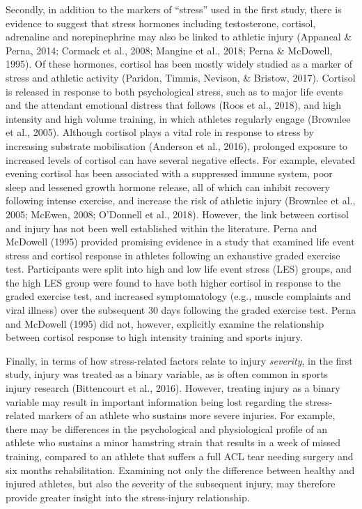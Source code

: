 \documentclass[man,floatsintext]{apa6}
\begin{document}
Secondly, in addition to the markers of \enquote{stress} used in the first study, there is evidence to suggest that stress hormones including testosterone, cortisol, adrenaline and norepinephrine may also be linked to athletic injury (Appaneal \& Perna, 2014; Cormack et al., 2008; Mangine et al., 2018; Perna \& McDowell, 1995).
Of these hormones, cortisol has been mostly widely studied as a marker of stress and athletic activity (Paridon, Timmis, Nevison, \& Bristow, 2017).
Cortisol is released in response to both psychological stress, such as to major life events and the attendant emotional distress that follows (Roos et al., 2018), and high intensity and high volume training, in which athletes regularly engage (Brownlee et al., 2005).
Although cortisol plays a vital role in response to stress by increasing substrate mobilisation (Anderson et al., 2016), prolonged exposure to increased levels of cortisol can have several negative effects.
For example, elevated evening cortisol has been associated with a suppressed immune system, poor sleep and lessened growth hormone release, all of which can inhibit recovery following intense exercise, and increase the risk of athletic injury (Brownlee et al., 2005; McEwen, 2008; O'Donnell et al., 2018).
However, the link between cortisol and injury has not been well established within the literature.
Perna and McDowell (1995) provided promising evidence in a study that examined life event stress and cortisol response in athletes following an exhaustive graded exercise test.
Participants were split into high and low life event stress (LES) groups, and the high LES group were found to have both higher cortisol in response to the graded exercise test, and increased symptomatology (e.g., muscle complaints and viral illness) over the subsequent 30 days following the graded exercise test.
Perna and McDowell (1995) did not, however, explicitly examine the relationship between cortisol response to high intensity training and sports injury.

Finally, in terms of how stress-related factors relate to injury \emph{severity}, in the first study, injury was treated as a binary variable, as is often common in sports injury research (Bittencourt et al., 2016).
However, treating injury as a binary variable may result in important information being lost regarding the stress-related markers of an athlete who sustains more severe injuries.
For example, there may be differences in the psychological and physiological profile of an athlete who sustains a minor hamstring strain that results in a week of missed training, compared to an athlete that suffers a full ACL tear needing surgery and six months rehabilitation.
Examining not only the difference between healthy and injured athletes, but also the severity of the subsequent injury, may therefore provide greater insight into the stress-injury relationship.
\end{document}

